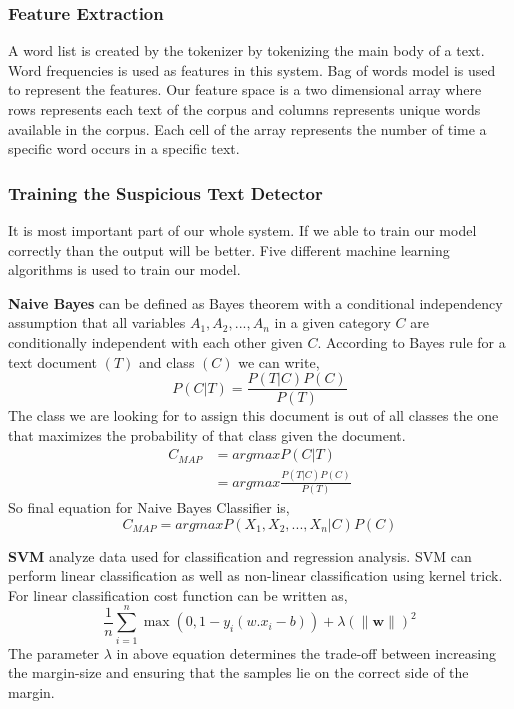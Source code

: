 \subsubsection{\textbf{Feature Extraction}}
A word list is created by the tokenizer by tokenizing the main body of a text. Word frequencies is used as features in this system. Bag of words model is used to represent the features. Our feature space is a two dimensional array where rows represents each text of the corpus and columns represents unique words available in the corpus. Each cell of the array represents the number of time a specific word occurs in a specific text.
\subsubsection{\textbf{Training the Suspicious Text Detector}}
It is most important part of our whole system. If we able to train our model correctly than the output will be better. Five different machine learning algorithms is used to train our model. 
\vspace{0.3cm}

\textbf{Naive Bayes}\cite{yoo2015classification} can be defined as Bayes theorem with a conditional independency assumption that all variables $A_{1},A_{2},...,A_{n}$ in a given category $C$ are conditionally independent with each other given $C$. 
According to Bayes rule for a text document $(T)$ and class $(C)$ we can write,
\begin{equation}
    P(C|T) = \frac{P(T|C)P(C)}{P(T)}
\end{equation}
The class we are looking for to assign this document is out of all classes the one that maximizes the probability of that class given the document.
\begin{equation}\label{eq:11}
 \begin{aligned}
     C_{MAP} & = argmax P(C|T) \\     & = argmax \frac{P(T|C)P(C)}{P(T)}
\end{aligned}
\end{equation}
So final equation for Naive Bayes Classifier is,
\begin{equation}
     C_{MAP} = argmax P(X_{1},X_{2},...,X_{n}|C)P(C)
\end{equation}
\vspace{0.1cm}

\textbf{SVM}\cite{wei2012text, villmann2017can} analyze data used for classification and regression analysis. SVM can perform linear classification as well as non-linear classification using kernel trick. For linear classification cost function can be written as,
\begin{equation}
    \label{cost_function_svm}
    \frac{1}{n}\sum_{i=1}^{n}\max{(0,1-y_{i}(w.x_{i}-b))} + \lambda (\lVert \mathbf{w} \rVert)^2
\end{equation}
The parameter $\lambda $ in above equation determines the trade-off between increasing the margin-size and ensuring that the samples lie on the correct side of the margin.

